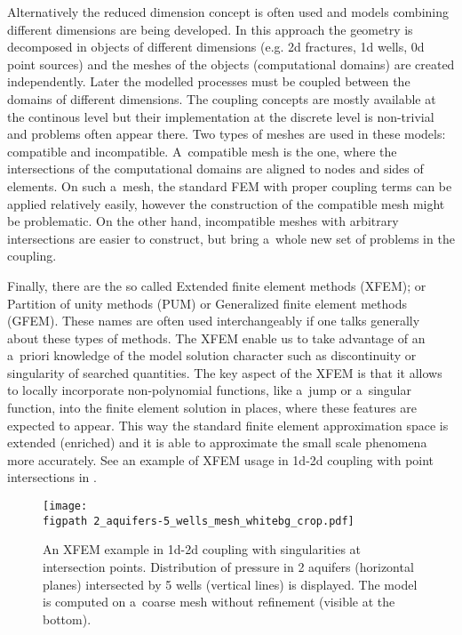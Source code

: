 Alternatively the reduced dimension concept is often used and models combining different dimensions are being developed.
In this approach the geometry is decomposed in objects of different dimensions (e.g. 2d fractures, 1d wells, 0d point sources)
and the meshes of the objects (computational domains) are created independently.
Later the modelled processes must be coupled between the domains of different dimensions.
The coupling concepts are mostly available at the continous level but their implementation
at the discrete level is non-trivial and problems often appear there.
Two types of meshes are used in these models: compatible and incompatible.
A~compatible mesh is the one, where the intersections of the computational domains are aligned to nodes and sides of elements.
On such a~mesh, the standard FEM with proper coupling terms can be applied relatively easily,
however the construction of the compatible mesh might be problematic.
On the other hand, incompatible meshes with arbitrary intersections are easier to construct, 
but bring a~whole new set of problems in the coupling.


Finally, there are the so called Extended finite element methods (XFEM); or Partition of unity methods (PUM) or Generalized
finite element methods (GFEM). These names are often used interchangeably if one talks generally about these types of methods. 
The XFEM enable us to take advantage of an a~priori knowledge of the model solution character
such as discontinuity or singularity of searched quantities.
The key aspect of the XFEM is that it allows to locally incorporate non-polynomial functions, like a~jump or a~singular function,
into the finite element solution in places, where these features are expected to appear.
This way the standard finite element approximation space is extended (enriched) and it is able to approximate the small scale phenomena
more accurately.
See an example of XFEM usage in 1d-2d coupling with point intersections in .
\begin{figure}[!htb]
  \centering    
    \texttt{[image: \\figpath 2\_aquifers-5\_wells\_mesh\_whitebg\_crop.pdf]}
  \caption[XFEM example for well-aquifer model with singularities.]
        { An XFEM example in 1d-2d coupling with singularities at intersection points.
            Distribution of pressure in 2 aquifers (horizontal planes) intersected by 5 wells 
            (vertical lines) is displayed. The model is computed on a~coarse mesh without refinement (visible at the bottom). }
  \label{fig:aquifers}
\end{figure}

